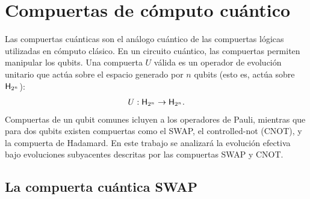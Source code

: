 \section{Compuertas de cómputo cuántico}

Las compuertas cuánticas son el análogo cuántico de las compuertas lógicas utilizadas en cómputo clásico. En un circuito cuántico, las compuertas permiten manipular los qubits. Una compuerta $U$ válida es un operador de evolución unitario que actúa sobre el espacio generado por $n$ qubits (esto es, actúa sobre ${\sf H}_{2^{n}}$):
\begin{equation}
  U:{\sf H}_{2^{n}}\rightarrow{\sf H}_{2^{n}}.\nonumber
\end{equation}
Compuertas de un qubit comunes icluyen a los operadores de Pauli, mientras que para dos qubits existen compuertas como el SWAP, el controlled-not (CNOT), y la compuerta de Hadamard. En este trabajo se analizará la evolución efectiva bajo evoluciones subyacentes descritas por las compuertas SWAP y CNOT. 

\subsection{La compuerta cuántica SWAP}

